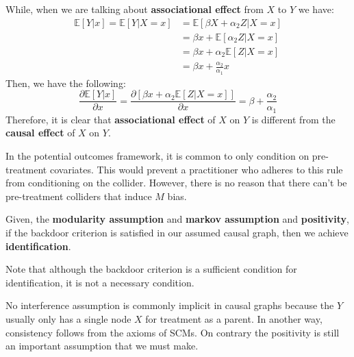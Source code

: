 While, when we are talking about \textbf{associational effect} from $X$ to $Y$ we have:
\begin{equation}
    \begin{array}{ll}
        \mathbb{E}[Y | x] = \mathbb{E}[Y | X = x] & = \mathbb{E}[\beta X + \alpha_2 Z | X = x] \\
                                                  & = \beta x + \mathbb{E}[\alpha_2 Z |X = x]  \\
                                                  & = \beta x + \alpha_2 \mathbb{E}[Z |X = x]  \\
                                                  & = \beta x + \frac{\alpha_2}{\alpha_1} x
    \end{array}
\end{equation}
Then, we have the following:
\begin{equation}
    \frac{\partial \mathbb{E}[Y |x]}{\partial x} = \frac{\partial[\beta x + \alpha_2 \mathbb{E}[Z |X = x]]}{\partial x} = \beta + \frac{\alpha_2}{\alpha_1}
\end{equation}
Therefore, it is clear that \textbf{associational effect} of  $X$ on $Y$ is
different from the \textbf{causal effect} of $X$ on $Y$.

In the potential outcomes framework, it is common to only condition on pre-treatment
covariates. This would prevent a practitioner who adheres to this rule from
conditioning on the collider. However, there is no reason that there can't be
pre-treatment colliders that induce $M$ bias.

Given, the \textbf{modularity assumption} and \textbf{markov assumption} and
\textbf{positivity}, if the backdoor criterion is satisfied in our assumed causal
graph, then we achieve \textbf{identification}.

\begin{note}
    Note that although the backdoor criterion is a sufficient condition for
    identification, it is not a necessary condition.
\end{note}
\begin{note}
    No interference assumption is commonly implicit in causal graphs because the $Y$
    usually only has a single node $X$ for treatment as a parent. In another way,
    consistency follows from the axioms of SCMs. On contrary the positivity is still
    an important assumption that we must make.
\end{note}


